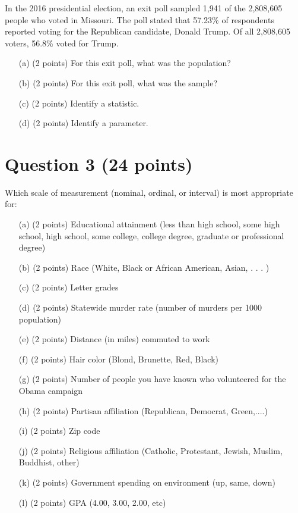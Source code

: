 \documentclass[12pt,letterpaper]{article}
\begin{document}
	In the 2016 presidential election, an exit poll sampled 1,941 of the 2,808,605 people who voted in Missouri. The poll stated that 57.23\% of respondents reported voting for the Republican candidate, Donald Trump. Of all 2,808,605 voters, 56.8\% voted for Trump.
	
	\begin{itemize}
		\item[(a)] (2 points) For this exit poll, what was the population? 
		\item[(b)] (2 points) For this exit poll, what was the sample?
		\item[(c)] (2 points) Identify a statistic.
		\item[(d)] (2 points) Identify a parameter.
	\end{itemize}
	
	\section*{Question 3 (24 points)}
	Which scale of measurement (nominal, ordinal, or interval) is most appropriate for:
	
	\begin{itemize}
		\item[(a)] (2 points) Educational attainment (less than high school, some high school, high school, some college, college degree, graduate or professional degree)
		\item[(b)] (2 points) Race (White, Black or African American, Asian, . . . )
		\item[(c)] (2 points) Letter grades
		\item[(d)] (2 points) Statewide murder rate (number of murders per 1000 population)
		\item[(e)] (2 points) Distance (in miles) commuted to work
		\item[(f)] (2 points) Hair color (Blond, Brunette, Red, Black)
		\item[(g)] (2 points) Number of people you have known who volunteered for the Obama campaign
		\item[(h)] (2 points) Partisan affiliation (Republican, Democrat, Green,....)
		\item[(i)] (2 points) Zip code
		\item[(j)] (2 points) Religious affiliation (Catholic, Protestant, Jewish, Muslim, Buddhist, other)
		\item[(k)] (2 points) Government spending on environment (up, same, down)
		\item[(l)] (2 points) GPA (4.00, 3.00, 2.00, etc)
	\end{itemize}
	
\end{document}
